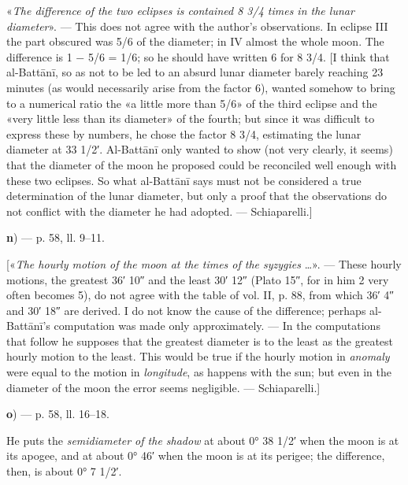 \documentclass[11pt]{article}
\newcommand{\Pg}[1]{\marginpar{\footnotesize\color{gray}#1}}
\begin{document}
\par «\emph{The difference of the two eclipses is contained 8 3/4 times in the lunar diameter}». — This does not agree with the author's observations. In eclipse III the part obscured was 5/6 of the diameter; in IV almost the whole moon. The difference is 1 − 5/6 = 1/6; so he should have written 6 for 8 3/4. [I think that al-Battānī, so as not to be led to an absurd lunar diameter barely reaching 23 minutes (as would necessarily arise from the factor 6), wanted somehow to bring to a numerical ratio the «a little more than 5/6» of the third eclipse and the «very little less than its diameter» of the fourth; but since it was difficult to express these by numbers, he chose the factor 8 3/4, estimating the lunar diameter at 33 1/2′. Al-Battānī only wanted to show (not very clearly, it seems) that the diameter of the moon he proposed could be reconciled well enough with these two eclipses. So what al-Battānī says must not be considered a true determination of the lunar diameter, but only a proof that the observations do not conflict with the diameter he had adopted. — Schiaparelli.]\par
\par\begin{center}\textbf{n}) — p. 58, ll. 9–11.\end{center}
\par \Pg{I 235}[«\emph{The hourly motion of the moon at the times of the syzygies} …». — These hourly motions, the greatest 36′ 10″ and the least 30′ 12″ (Plato 15″, for in him 2 very often becomes 5), do not agree with the table of vol. II, p. 88, from which 36′ 4″ and 30′ 18″ are derived. I do not know the cause of the difference; perhaps al-Battānī's computation was made only approximately. — In the computations that follow he supposes that the greatest diameter is to the least as the greatest hourly motion to the least. This would be true if the hourly motion in \emph{anomaly} were equal to the motion in \emph{longitude}, as happens with the sun; but even in the diameter of the moon the error seems negligible. — Schiaparelli.]\par
\par\begin{center}\textbf{o}) — p. 58, ll. 16–18.\end{center}
\par He puts the \emph{semidiameter of the shadow} at about 0° 38 1/2′ when the moon is at its apogee, and at about 0° 46′ when the moon is at its perigee; the difference, then, is about 0° 7 1/2′.\par
\end{document}
